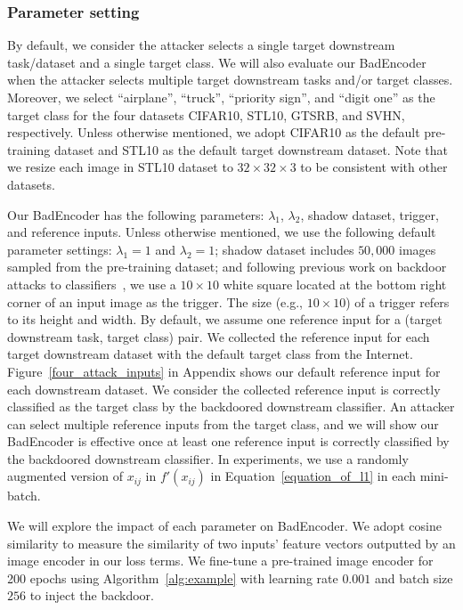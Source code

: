 \subsubsection{Parameter setting} 
\label{parameter_setting}
By default, we consider the attacker selects a single target downstream task/dataset and a single target class. 
We will also evaluate our BadEncoder when the attacker selects multiple target downstream tasks and/or target classes. Moreover, we select ``airplane'', ``truck'', ``priority sign'', and ``digit one'' as the target class for the four datasets CIFAR10, STL10, GTSRB, and SVHN, respectively. Unless otherwise mentioned, we adopt CIFAR10 as the default pre-training dataset and STL10 as the default target downstream dataset. Note that we resize each image in STL10 dataset to $32 \times 32 \times 3$ to be consistent with other datasets. 



Our BadEncoder has the following parameters: $\lambda_1$, $\lambda_2$, shadow dataset, trigger, and reference inputs. 
Unless otherwise mentioned, we use the following default parameter settings: $\lambda_1 = 1$ and $\lambda_2 = 1$; shadow dataset includes $50,000$ images sampled from the pre-training dataset; and following previous work on backdoor attacks to classifiers~\cite{wang2019neural}, we use a $10 \times 10$ white square located at the bottom right corner of an input image as the trigger. The size (e.g., $10 \times 10$) of a trigger refers to its height and width. 
By default, we assume one reference input for a (target downstream task, target class) pair. We collected the reference input for each target downstream dataset with the default target class from the Internet. Figure~\ref{four_attack_inputs} in Appendix shows our default reference input for each downstream dataset. We consider the collected reference input is correctly classified as the target class by the backdoored downstream classifier.   An attacker can select multiple reference inputs from the target class, and 
we will show our BadEncoder is effective once at least one reference input is correctly classified by the backdoored downstream classifier. In experiments, we use a randomly augmented version of $x_{ij}$ in $f'(x_{ij})$ in Equation~\ref{equation_of_l1} in each mini-batch. 

We will explore the impact of each parameter on BadEncoder. 
We adopt cosine similarity to measure the similarity of two inputs' feature vectors outputted by an image encoder  in our loss terms. We fine-tune a pre-trained image encoder for 200 epochs using Algorithm~\ref{alg:example} with learning rate $0.001$ and batch size $256$ to inject the backdoor. 

